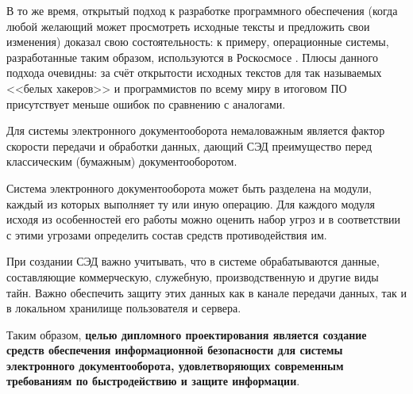 \vspace{\baselineskip}
В то же время, открытый подход к разработке программного обеспечения (когда любой желающий может просмотреть исходные тексты и предложить свои изменения) доказал свою состоятельность: к примеру, операционные системы, разработанные таким образом, используются в Роскосмосе \cite{roskosmos}. Плюсы данного подхода очевидны: за счёт открытости исходных текстов для так называемых <<белых хакеров>> и программистов по всему миру в итоговом ПО присутствует меньше ошибок по сравнению с аналогами.

\vspace{\baselineskip}
Для системы электронного документооборота немаловажным является фактор скорости передачи и обработки данных, дающий СЭД преимущество перед классическим (бумажным) документооборотом.

\vspace{\baselineskip}
Система электронного документооборота может быть разделена на модули, каждый из которых выполняет ту или иную операцию. Для каждого модуля исходя из особенностей его работы можно оценить набор угроз и в соответствии с этими угрозами определить состав средств противодействия им.

\vspace{\baselineskip}
При создании СЭД важно учитывать, что в системе обрабатываются данные, составляющие коммерческую, служебную, производственную и другие виды тайн. Важно обеспечить защиту этих данных как в канале передачи данных, так и в локальном хранилище пользователя и сервера.

\vspace{\baselineskip}
Таким образом, \textbf{целью дипломного проектирования является создание средств обеспечения информационной безопасности для системы электронного документооборота, удовлетворяющих современным требованиям по быстродействию и защите информации}.